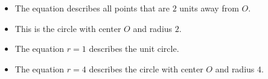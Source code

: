 \begin{frame}
\begin{example}[Example 4, p. 677]
\begin{columns}[c]
{}%
\begin{itemize}
\item<2->  The equation describes all points that are $2$ units away from $O$.
\item<3->  This is the circle with center $O$ and radius $2$.
\item<4->  The equation $r = 1$ describes the unit circle.
\item<5->  The equation $r = 4$ describes the circle with center $O$ and radius $4$.
\end{itemize}
\end{columns}
\end{example}
\end{frame}
